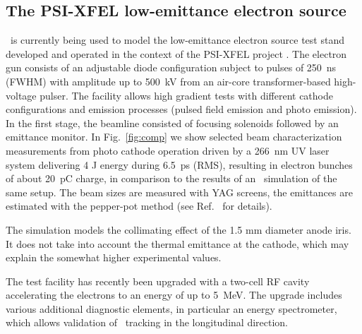 \documentclass[acus]{JAC2003}
\begin{document}
\subsection{The PSI-XFEL low-emittance electron source}
\opal\ is currently being used to model the low-emittance electron source test stand 
developed and operated in the context of the PSI-XFEL project \cite{obla}.  
The electron gun consists of an adjustable diode configuration subject to pulses of 250~ns (FWHM) 
with amplitude up to 500~kV from an air-core transformer-based high-voltage pulser. 
The facility allows high gradient tests with different cathode configurations and emission processes 
(pulsed field emission and photo emission). 
In the first stage, the beamline consisted of focusing solenoids followed by an emittance 
monitor. 
In Fig.~\ref{fig:comp} we show selected beam characterization measurements from photo cathode operation 
driven by a 266~nm UV laser system delivering 4 \textmu J energy during 6.5~ps (RMS), resulting in 
electron bunches of about 20~pC charge, in comparison to the results of an \opal\ simulation of the same
setup.
The beam sizes are measured with YAG screens, the emittances are estimated with the pepper-pot method
(see Ref.~\cite{obla} for details).

The simulation models the collimating effect of the 1.5 mm diameter anode iris. 
It does not take into account the thermal emittance at the cathode, which may explain the somewhat higher
experimental values.  

The test facility has recently been upgraded with a two-cell RF cavity accelerating the electrons
to an energy of up to 5~MeV.
The upgrade includes various additional diagnostic elements, in particular an energy spectrometer, 
which allows validation of \opal\ tracking in the longitudinal direction.
\end{document}
